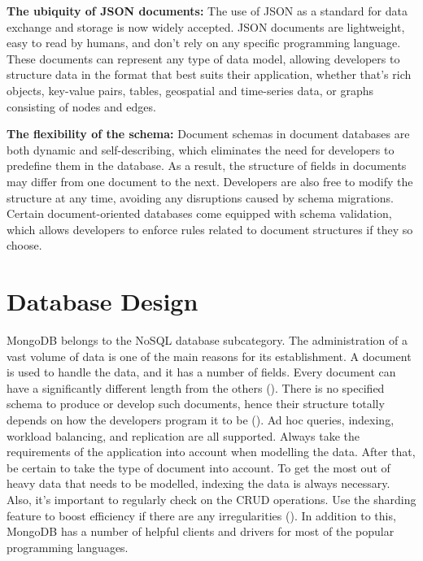 \textbf{The ubiquity of JSON documents:} The use of JSON as a standard for data exchange and storage is now widely accepted. JSON documents are lightweight, easy to read by humans, and don't rely on any specific programming language. These documents can represent any type of data model, allowing developers to structure data in the format that best suits their application, whether that's rich objects, key-value pairs, tables, geospatial and time-series data, or graphs consisting of nodes and edges.

\textbf{The flexibility of the schema:} Document schemas in document databases are both dynamic and self-describing, which eliminates the need for developers to predefine them in the database. As a result, the structure of fields in documents may differ from one document to the next. Developers are also free to modify the structure at any time, avoiding any disruptions caused by schema migrations. Certain document-oriented databases come equipped with schema validation, which allows developers to enforce rules related to document structures if they so choose.




\section{Database Design}
MongoDB belongs to the NoSQL database subcategory. The administration of a vast volume of data is one of the main reasons for its establishment. A document is used to handle the data, and it has a number of fields. Every document can have a significantly different length from the others (\cite{mungekar_2019}). There is no specified schema to produce or develop such documents, hence their structure totally depends on how the developers program it to be (\cite{taylor_2020}).
Ad hoc queries, indexing, workload balancing, and replication are all supported.
Always take the requirements of the application into account when modelling the data. After that, be certain to take the type of document into account. To get the most out of heavy data that needs to be modelled, indexing the data is always necessary. Also, it's important to regularly check on the CRUD operations. Use the sharding feature to boost efficiency if there are any irregularities (\cites{taylor_2020}{mungekar_2019}).
In addition to this, MongoDB has a number of helpful clients and drivers for most of the popular programming languages.

